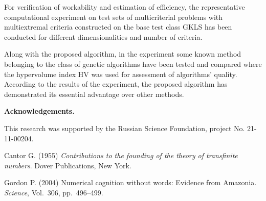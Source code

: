 \documentclass[oribibl]{llncs}
\begin{document}
For verification of workability and estimation of efficiency, the representative computational experiment on test sets of multicriterial problems with multiextremal criteria constructed on the base test class GKLS  has been conducted for different dimensionalities and number of criteria. 

Along with the proposed algorithm, in the experiment some known method belonging to the class of genetic algorithms have been tested and compared where the hypervolume index  HV was used for assessment of algorithms' quality. According to the results of the experiment, the proposed algorithm  has demonstrated its essential advantage over other methods.


\textbf{Acknowledgements.}

This research was supported by the Russian Science Foundation, project No. 21-11-00204.

 \vspace{0.5cm}

\begin{thebibliography}{4}

 Cantor G. (1955) \emph{Contributions to the founding of the theory of transfinite numbers}. Dover Publications, New York.

 Gordon P. (2004) Numerical cognition without words: {E}vidence from {A}mazonia. \emph{Science}, Vol.~306,
pp.~496--499.

\end{thebibliography}
\end{document}
